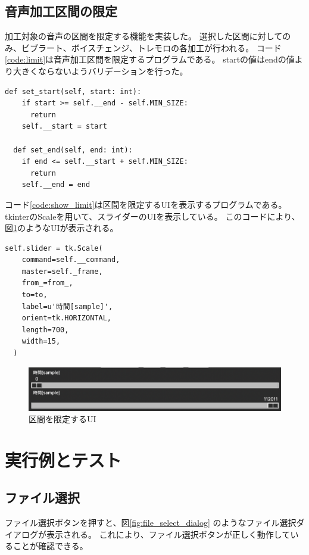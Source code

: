 \documentclass[a4paper,11pt]{jsarticle}
\begin{document}
\subsection{音声加工区間の限定}

加工対象の音声の区間を限定する機能を実装した。
選択した区間に対してのみ、ビブラート、ボイスチェンジ、トレモロの各加工が行われる。
コード\ref{code:limit}は音声加工区間を限定するプログラムである。
startの値はendの値より大きくならないようバリデーションを行った。

\begin{lstlisting}[caption=音声加工区間の限定,label=code:limit]
  def set_start(self, start: int):
    if start >= self.__end - self.MIN_SIZE:
      return
    self.__start = start

  def set_end(self, end: int):
    if end <= self.__start + self.MIN_SIZE:
      return
    self.__end = end
\end{lstlisting}

コード\ref{code:show_limit}は区間を限定するUIを表示するプログラムである。
tkinterのScaleを用いて、スライダーのUIを表示している。
このコードにより、図\ref{fig:sliders}のようなUIが表示される。

\begin{lstlisting}[caption=区間を限定するUI,label=code:show_limit]
  self.slider = tk.Scale(
    command=self.__command,
    master=self._frame,
    from_=from_,
    to=to,
    label=u'時間[sample]',
    orient=tk.HORIZONTAL,
    length=700,
    width=15,
  )
\end{lstlisting}

\begin{figure}[h]
\centering
\includegraphics[keepaspectratio, width = 13cm]
{./images/sliders.png}
\caption{区間を限定するUI}
\label{fig:sliders}
\end{figure}

\section{実行例とテスト}
\subsection{ファイル選択}
ファイル選択ボタンを押すと、図\ref{fig:file_select_dialog}
のようなファイル選択ダイアログが表示される。
これにより、ファイル選択ボタンが正しく動作していることが確認できる。
\end{document}
